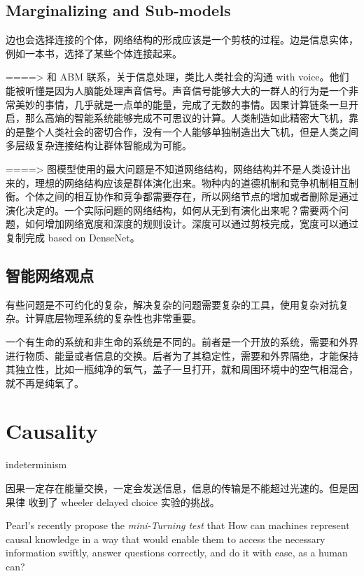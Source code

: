 \documentclass{article}
\theoremstyle{definition}
\theoremstyle{remark}
\theoremstyle{definition}
\begin{document}
\begin{CJK*}{UTF8}{gbsn}
\subsection{Marginalizing and Sub-models}

边也会选择连接的个体，网络结构的形成应该是一个剪枝的过程。边是信息实体，例如一本书，选择了某些个体连接起来。


====> 和 ABM 联系，关于信息处理，类比人类社会的沟通 with voice。他们能被听懂是因为人脑能处理声音信号。声音信号能够大大的一群人的行为是一个非常美妙的事情，几乎就是一点单的能量，完成了无数的事情。因果计算链条一旦开启，那么高熵的智能系统能够完成不可思议的计算。人类制造如此精密大飞机，靠的是整个人类社会的密切合作，没有一个人能够单独制造出大飞机，但是人类之间多层级复杂连接结构让群体智能成为可能。


====> 图模型使用的最大问题是不知道网络结构，网络结构并不是人类设计出来的，理想的网络结构应该是群体演化出来。物种内的道德机制和竞争机制相互制衡。个体之间的相互协作和竞争都需要存在，所以网络节点的增加或者删除是通过演化决定的。一个实际问题的网络结构，如何从无到有演化出来呢？需要两个问题，如何增加网络宽度和深度的规则设计。深度可以通过剪枝完成，宽度可以通过复制完成 based on DenseNet。




\subsection{智能网络观点}

有些问题是不可约化的复杂，解决复杂的问题需要复杂的工具，使用复杂对抗复杂。计算底层物理系统的复杂性也非常重要。

一个有生命的系统和非生命的系统是不同的。前者是一个开放的系统，需要和外界进行物质、能量或者信息的交换。后者为了其稳定性，需要和外界隔绝，才能保持其独立性，比如一瓶纯净的氧气，盖子一旦打开，就和周围环境中的空气相混合，就不再是纯氧了。

\section{Causality}

indeterminism


因果一定存在能量交换，一定会发送信息，信息的传输是不能超过光速的。但是因果律 收到了 wheeler delayed choice 实验的挑战。


Pearl's recently propose the \emph{mini-Turning test} that  How can machines represent causal knowledge in a way that would enable them to access the necessary information swiftly, answer questions correctly, and do it with ease, as a human can? 


\end{CJK*}
\end{document}
